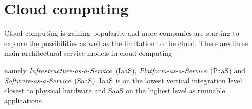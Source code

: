 

\section{Cloud computing}

Cloud computing is gaining popularity and more companies are starting 
to explore the possibilities as well as the limitation to the cloud.
There are three main architectural service models in cloud computing\cite{nist:mell11}

namely \emph{Infrastructure-as-a-Service}~(IaaS), \emph{Platform-as-a-Service}~(PaaS)
and \emph{Software-as-a-Service}~(SaaS).
IaaS is on the lowest vertical integration level closest to physical hardware and SaaS on the highest
level as runnable applications.
